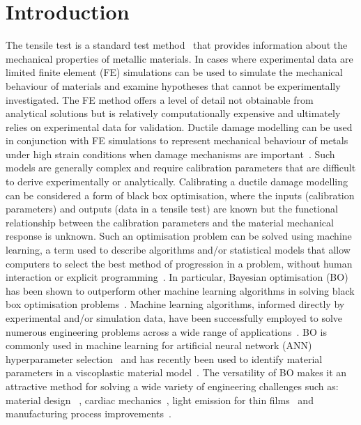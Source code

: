 \documentclass[preprint, review, 12pt]{elsarticle}
\begin{document}
	\section{Introduction}
	\label{h:introduction}

	The tensile test is a standard test method~\cite{ENISO6892} that provides information about the mechanical properties of metallic materials.
	In cases where experimental data are limited finite element (FE) simulations can be used to simulate the mechanical behaviour of materials and examine hypotheses that cannot be experimentally investigated.
	The FE method offers a level of detail not obtainable from analytical solutions but is relatively computationally expensive and ultimately relies on experimental data for validation.
	Ductile damage modelling can be used in conjunction with FE simulations to represent mechanical behaviour of metals under high strain conditions when damage mechanisms are important~\cite{ABBASSI2013, CHAHBOUB2019, ZHANG2021}.
	Such models are generally complex and require calibration parameters that are difficult to derive experimentally or analytically.
	Calibrating a ductile damage modelling can be considered a form of black box optimisation, where the inputs (calibration parameters) and outputs (data in a tensile test) are known but the functional relationship between the calibration parameters and the material mechanical response is unknown.
	Such an optimisation problem can be solved using machine learning, a term used to describe algorithms and/or statistical models that allow computers to select the best method of progression in a problem, without human interaction or explicit programming~\cite{BIKMKHAMETOV2020}.
	In particular, Bayesian optimisation (BO) has been shown to outperform other machine learning algorithms in solving black box optimisation problems~\cite{SNOEK2012}.
	Machine learning algorithms, informed directly by experimental and/or simulation data, have been successfully employed to solve numerous engineering problems across a wide range of applications~\cite{MONGAN2022, LIU2020, HEGDE2020}.
	BO is commonly used in machine learning for artificial neural network (ANN) hyperparameter selection~\cite{DEWANCKER2016, MONGAN2022, BIKMKHAMETOV2020, GHAVAMIAN2021} and has recently been used to identify material parameters in a viscoplastic material model~\cite{RYAN2022}.
	The versatility of BO makes it an attractive method for solving a wide variety of engineering challenges such as: material design ~\cite{ZHANG2020, CHUAQUI2021}, cardiac mechanics~\cite{BOROWSKA2022}, light emission for thin films~\cite{WANKERL2022} and manufacturing process improvements~\cite{MONGAN2022, GUNN2022}.
\end{document}
